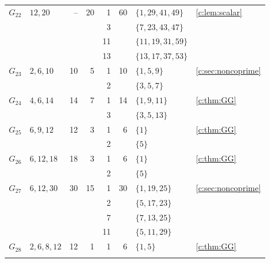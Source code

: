 \documentclass[10pt,a4paper]{amsart}
\theoremstyle{definition}
\begin{document}
\begin{longtable}{@{}lL{.24\textwidth}rrrrL{.26\textwidth}L{.14\textwidth}@{}}
\midrule[.25pt]
$G_{22}$ & $12,\allowbreak 20$ & -- & 20 & 1 & 60 & $\{1,\allowbreak 29,\allowbreak 41,\allowbreak 49\}$ & \cref{c:lem:scalar} \\*
 &  &  &  & 3 &  & $\{7,\allowbreak 23,\allowbreak 43,\allowbreak 47\}$ &  \\*
 &  &  &  & 11 &  & $\{11,\allowbreak 19,\allowbreak 31,\allowbreak 59\}$ &  \\*
 &  &  &  & 13 &  & $\{13,\allowbreak 17,\allowbreak 37,\allowbreak 53\}$ &  \\
\midrule[.25pt]
$G_{23}$ & $2,\allowbreak 6,\allowbreak 10$ & 10 & 5 & 1 & 10 & $\{1,\allowbreak 5,\allowbreak 9\}$ & \cref{c:sec:noncoprime} \\*
 &  &  &  & 2 &  & $\{3,\allowbreak 5,\allowbreak 7\}$ &  \\
\midrule[.25pt]
$G_{24}$ & $4,\allowbreak 6,\allowbreak 14$ & 14 & 7 & 1 & 14 & $\{1,\allowbreak 9,\allowbreak 11\}$ & \cref{c:thm:GG} \\*
 &  &  &  & 3 &  & $\{3,\allowbreak 5,\allowbreak 13\}$ &  \\
\midrule[.25pt]
$G_{25}$ & $6,\allowbreak 9,\allowbreak 12$ & 12 & 3 & 1 & 6 & $\{1\}$ & \cref{c:thm:GG} \\*
 &  &  &  & 2 &  & $\{5\}$ &  \\
\midrule[.25pt]
$G_{26}$ & $6,\allowbreak 12,\allowbreak 18$ & 18 & 3 & 1 & 6 & $\{1\}$ & \cref{c:thm:GG} \\*
 &  &  &  & 2 &  & $\{5\}$ &  \\
\midrule[.25pt]
$G_{27}$ & $6,\allowbreak 12,\allowbreak 30$ & 30 & 15 & 1 & 30 & $\{1,\allowbreak 19,\allowbreak 25\}$ & \cref{c:sec:noncoprime} \\*
 &  &  &  & 2 &  & $\{5,\allowbreak 17,\allowbreak 23\}$ &  \\*
 &  &  &  & 7 &  & $\{7,\allowbreak 13,\allowbreak 25\}$ &  \\*
 &  &  &  & 11 &  & $\{5,\allowbreak 11,\allowbreak 29\}$ &  \\
\midrule[.25pt]
$G_{28}$ & $2,\allowbreak 6,\allowbreak 8,\allowbreak 12$ & 12 & 1 & 1 & 6 & $\{1,\allowbreak 5\}$ & \cref{c:thm:GG} \\
\midrule[.25pt]

\end{longtable}
\end{document}
